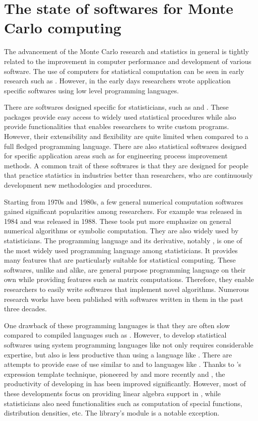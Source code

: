 \section{The state of softwares for Monte Carlo computing}
\label{sec:The state of softwares for Monte Carlo computing}

The advancement of the Monte Carlo research and statistics in general is
tightly related to the improvement in computer performance and development of
various software. The use of computers for statistical computation can be seen
in early research such as \cite{metropolis1953}. However, in the early days
researchers wrote application specific softwares using low level programming
languages.

There are softwares designed specific for statisticians, such as \sas and
\spss. These packages provide easy access to widely used statistical
procedures while also provide functionalities that enables researchers to
write custom programs. However, their extensibility and flexibility are quite
limited when compared to a full fledged programming language. There are also
statistical softwares designed for specific application areas such as \minitab
for engineering process improvement methods. A common trait of these softwares
is that they are designed for people that practice statistics in industries
better than researchers, who are continuously development new methodologies
and procedures.

Starting from 1970s and 1980s, a few general numerical computation softwares
gained significant popularities among researchers. For example \matlab was
released in 1984 and \mathematica was released in 1988. These tools put more
emphasize on general numerical algorithms or symbolic computation. They are
also widely used by statisticians. The \slang programming language and its
derivative, notably \rlang \cite{rlang}, is one of the most widely used
programming language among statisticians. It provides many features that are
particularly suitable for statistical computing. These softwares, unlike \sas
and alike, are general purpose programming language on their own while
providing features such as matrix computations. Therefore, they enable
researchers to easily write softwares that implement novel algorithms.
Numerous research works have been published with softwares written in them in
the past three decades.

One drawback of these programming languages is that they are often slow
compared to compiled languages such as \cpp. However, to develop statistical
softwares using system programming languages like \cpp not only requires
considerable expertise, but also is less productive than using a language like
\rlang. There are attempts to provide ease of use similar to \matlab and
\rlang to languages like \cpp. Thanks to \cpp's expression template technique,
pioneered by \blitzpp and more recently \armadillo and \eigen, the
productivity of developing in \cpp has been improved significantly. However,
most of these developments focus on providing linear algebra support in \cpp,
while statisticians also need functionalities such as computation of special
functions, distribution densities, etc. The \boost \cite{boost} library's
 module is a notable exception.

